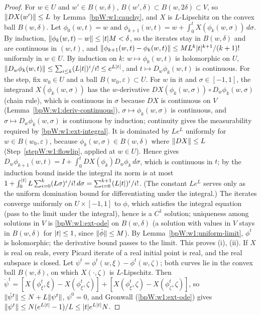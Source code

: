 \begin{proof}
\label{stepW:w1:flowlip}
For $w\in U$ and $w'\in B(w,\delta)$, $B(w',\delta)\subset B(w,2\delta)\subset V$, so $\lVert DX(w')\rVert\le L$ by
Lemma~\ref{bpW:w1:cauchy}, and $X$ is $L$-Lipschitz on the convex ball $B(w,\delta)$.
\label{stepW:w1:picard}
Let $\phi_0(w,t)=w$ and $\phi_{k+1}(w,t)=w+\int_0^tX(\phi_k(w,\sigma))\,d\sigma$. By induction,
$\lVert \phi_k(w,t)-w\rVert\le\lvert t\rvert M<\delta$, so the iterates stay in $B(w,\delta)$ and are continuous in $(w,t)$, and
$\lVert \phi_{k+1}(w,t)-\phi_k(w,t)\rVert\le M L^k\lvert t\rvert^{k+1}/(k+1)!$ uniformly in $w\in U$.
\label{stepW:w1:picardholo}
By induction on $k$: $w\mapsto\phi_k(w,t)$ is holomorphic on $U$, $\lVert D_w\phi_k(w,t)\rVert\le\sum_{i\le k}(L\lvert t\rvert)^i/i!
\le e^{L\lvert t\rvert}$, and $t\mapsto D_w\phi_k(w,t)$ is continuous. For the step, fix $w_0\in U$ and a ball
$B(w_0,\varepsilon)\subset U$. For $w$ in it and $\sigma\in[-1,1]$, the integrand $X(\phi_k(w,\sigma))$ has the
$w$-derivative $DX(\phi_k(w,\sigma))\circ D_w\phi_k(w,\sigma)$ (chain rule), which is continuous in $\sigma$ because
$DX$ is continuous on $V$ (Lemma~\ref{bpW:w1:deriv-continuous}), $\sigma\mapsto\phi_k(w,\sigma)$ is continuous, and
$\sigma\mapsto D_w\phi_k(w,\sigma)$ is continuous by induction; continuity gives the measurability required by
\ref{bpW:w1:ext-integral}. It is dominated by $Le^{L}$ uniformly for $w\in B(w_0,\varepsilon)$, because
$\phi_k(w,\sigma)\in B(w,\delta)$ where $\lVert DX\rVert\le L$ (Step~\ref{stepW:w1:flowlip}, applied at $w\in U$). Hence
 gives $D_w\phi_{k+1}(w,t)=I+\int_0^tDX(\phi_k)D_w\phi_k\,d\sigma$,
which is continuous in $t$; by the induction bound inside the integral its norm is at most
$1+\int_0^{\lvert t\rvert}L\sum_{i=0}^k(L\sigma)^i/i!\,d\sigma=\sum_{i=0}^{k+1}(L\lvert t\rvert)^i/i!$. (The constant $Le^L$ serves only as
the uniform domination bound for differentiating under the integral.)
\label{stepW:w1:flowlim}
The iterates converge uniformly on $U\times[-1,1]$ to $\phi$, which satisfies the integral equation (pass to the limit
under the integral), hence is a $C^1$ solution; uniqueness among solutions in $V$ is \ref{bpW:w1:ext-ode} on
$B(w,\delta)$ (a solution with values in $V$ stays in $B(w,\delta)$ for $\lvert t\rvert\le1$, since $\lVert \dot\phi\rVert\le M$). By
Lemma~\ref{bpW:w1:uniform-limit}, $\phi^t$ is holomorphic; the derivative bound passes to the limit. This proves (i),
(ii).
\label{stepW:w1:flowreal}
If $X$ is real on reals, every Picard iterate of a real initial point is real, and the real subspace is closed.
\label{stepW:w1:flowpar}
Let $\psi^t=\phi^t(w,\xi)-\phi^t(w,\zeta)$; both curves lie in the convex ball $B(w,\delta)$, on which $X(\cdot,\zeta)$ is
$L$-Lipschitz. Then $\dot\psi^t=[X(\phi^t_\xi,\xi)-X(\phi^t_\xi,\zeta)]+[X(\phi^t_\xi,\zeta)-X(\phi^t_\zeta,\zeta)]$, so
$\lVert \dot\psi^t\rVert\le N+L\lVert \psi^t\rVert$, $\psi^0=0$, and Gronwall (\ref{bpW:w1:ext-ode}) gives
$\lVert \psi^t\rVert\le N(e^{L\lvert t\rvert}-1)/L\le\lvert t\rvert e^{L\lvert t\rvert}N$.
\end{proof}

